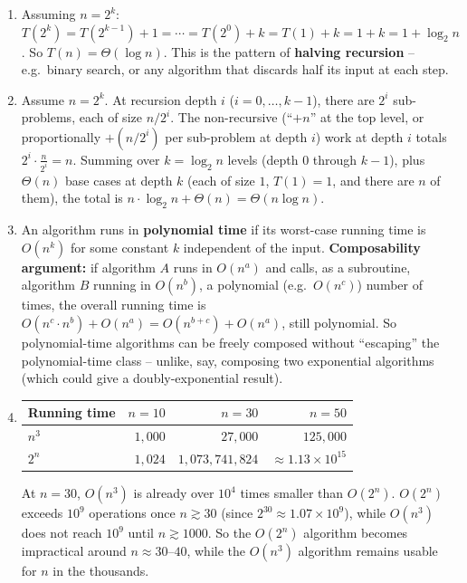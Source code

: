 \documentclass[11pt]{article}
\begin{document}
\begin{enumerate}[label=\textbf{A\arabic*.}, leftmargin=2.2em]
\item Assuming $n = 2^k$: $T(2^k) = T(2^{k-1})+1 = \cdots = T(2^0) + k = T(1) + k = 1+k =
1 + \log_2 n$. So $T(n) = \Theta(\log n)$. This is the pattern of \textbf{halving
recursion} -- e.g.\ binary search, or any algorithm that discards half its input at each
step.

\item Assume $n=2^k$. At recursion depth $i$ ($i=0,\ldots,k-1$), there are $2^i$
sub-problems, each of size $n/2^i$. The non-recursive (``$+n$'' at the top level, or
proportionally $+(n/2^i)$ per sub-problem at depth $i$) work at depth $i$ totals $2^i
\cdot \frac{n}{2^i} = n$. Summing over $k = \log_2 n$ levels (depth $0$ through $k-1$),
plus $\Theta(n)$ base cases at depth $k$ (each of size $1$, $T(1)=1$, and there are $n$ of
them), the total is $n \cdot \log_2 n + \Theta(n) = \Theta(n \log n)$.

\item An algorithm runs in \textbf{polynomial time} if its worst-case running time is
$O(n^k)$ for some constant $k$ independent of the input. \textbf{Composability argument:}
if algorithm $A$ runs in $O(n^a)$ and calls, as a subroutine, algorithm $B$ running in
$O(n^b)$, a polynomial (e.g.\ $O(n^c)$) number of times, the overall running time is
$O(n^c \cdot n^b) + O(n^a) = O(n^{b+c}) + O(n^a)$, still polynomial. So polynomial-time
algorithms can be freely composed without ``escaping'' the polynomial-time class --
unlike, say, composing two exponential algorithms (which could give a doubly-exponential
result).

\item
\begin{center}
\begin{tabular}{@{}lrrr@{}}
\toprule
Running time & $n=10$ & $n=30$ & $n=50$ \\
\midrule
$n^3$ & $1{,}000$ & $27{,}000$ & $125{,}000$ \\
$2^n$ & $1{,}024$ & $1{,}073{,}741{,}824$ & $\approx 1.13 \times 10^{15}$ \\
\bottomrule
\end{tabular}
\end{center}
At $n=30$, $O(n^3)$ is already over $10^4$ times smaller than $O(2^n)$. $O(2^n)$ exceeds
$10^9$ operations once $n \gtrsim 30$ (since $2^{30} \approx 1.07 \times 10^9$), while
$O(n^3)$ does not reach $10^9$ until $n \gtrsim 1000$. So the $O(2^n)$ algorithm becomes
impractical around $n \approx 30$--$40$, while the $O(n^3)$ algorithm remains usable for
$n$ in the thousands.


\end{enumerate}
\end{document}
